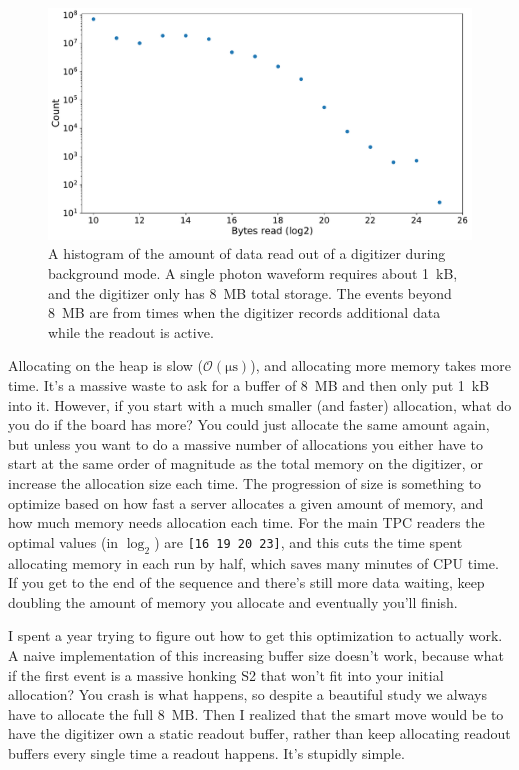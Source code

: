 \begin{figure}
  \includegraphics[width=\textwidth]{images/digi_blt}
  \caption{A histogram of the amount of data read out of a digitizer during background mode. A single photon waveform requires about 1~kB, and the digitizer only has 8~MB total storage. The events beyond 8~MB are from times when the digitizer records additional data while the readout is active.}\label{fig:digi_blt}
\end{figure}

Allocating on the heap is slow ($\mathcal{O}(\mathrm{\mu s})$), and allocating more memory takes more time.
It's a massive waste to ask for a buffer of 8~MB and then only put 1~kB into it.
However, if you start with a much smaller (and faster) allocation, what do you do if the board has more?
You could just allocate the same amount again, but unless you want to do a massive number of allocations you either have to start at the same order of magnitude as the total memory on the digitizer, or increase the allocation size each time.
The progression of size is something to optimize based on how fast a server allocates a given amount of memory, and how much memory needs allocation each time.
For the main TPC readers the optimal values (in $\log_2$) are \texttt{[16 19 20 23]}, and this cuts the time spent allocating memory in each run by half, which saves many minutes of CPU time.
If you get to the end of the sequence and there's still more data waiting, keep doubling the amount of memory you allocate and eventually you'll finish.

I spent a year trying to figure out how to get this optimization to actually work.
A naive implementation of this increasing buffer size doesn't work, because what if the first event is a massive honking S2 that won't fit into your initial allocation?
You crash is what happens, so despite a beautiful study we always have to allocate the full 8~MB.
Then I realized that the smart move would be to have the digitizer own a static readout buffer, rather than keep allocating readout buffers every single time a readout happens.
It's stupidly simple.


